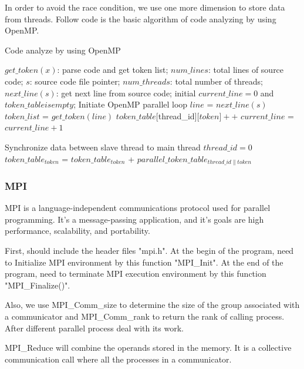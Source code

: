 \documentclass{acm_proc_article-sp}
\begin{document}
In order to avoid the race condition, we use one more dimension to store data from threads.
Follow code is the basic algorithm of code analyzing by using OpenMP.
\begin{algorithm}[h]
		\caption{Code analyze by using OpenMP}
		\begin{algorithmic}[1]
			\Require
				$get\_token(x)$: parse code and get token list;
				$num\_lines$: total lines of source code;
				$s$: source code file pointer;
				$num\_threads$: total number of threads;
				$next\_line(s)$: get next line from source code;
			\State initial $current\_line=0$ and $token\_table is empty$;
			\State Initiate OpenMP parallel loop
			\Repeat
				\State $line$ = $next\_line(s)$
				\State $token\_list$ = $get\_token(line)$
					\State $token\_table[$thread\_id][$token]++$
				\EndFor
				\State $current\_line$ = $current\_line + 1$

			\Comment Synchronize data between slave thread to main thread
				\State $thread\_id = 0$
					\State $token\_table_{token}$ = $token\_table_{token}$ + $parallel\_token\_table_{thread\_id\|token}$
				\EndWhile
			\EndFor
		\end{algorithmic}
\end{algorithm}

\subsubsection{MPI}
	MPI is a language-independent communications protocol used for parallel programming.
	It's a message-passing application, and it's goals are high performance, scalability, and portability. 

	First, should include the header files "mpi.h". At the begin of the program, need to Initialize
	MPI environment by this function "MPI\_Init". At the end of the program, need to terminate
	MPI execution environment by this function "MPI\_Finalize()".

	Also, we use MPI\_Comm\_size to determine the size of the group associated with a
	communicator and MPI\_Comm\_rank to return the rank of calling process. After different
	parallel process deal with its work.

	MPI\_Reduce will combine the operands stored in the memory. It is a collective communication
	call where all the processes in a communicator.
\end{document}
